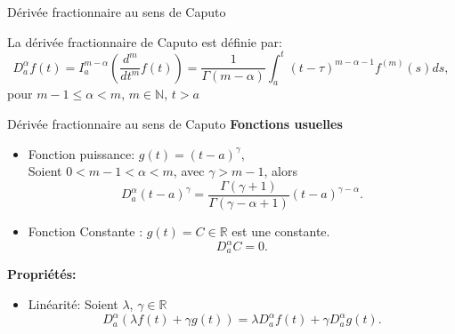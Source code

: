 \documentclass{sintefbeamer}
\begin{document}
\begin{frame}{Dérivée fractionnaire au sens de Caputo}
    \begin{definition}
    La dérivée fractionnaire de Caputo est définie par:
    \begin{equation}\label{eq:der_frac_caputo}
        D_a^{\alpha} f(t) = I_a^{m-\alpha}\left(\frac{d^m}{dt^m} f(t) \right) = \frac{1}{\Gamma(m-\alpha)}\int_a^t (t-\tau)^{m-\alpha -1} f^{(m)} (s)ds,
    \end{equation}
    pour $m-1\leq\alpha<m$, $m\in \mathbb{N}$, $t>a$
\end{definition}
\end{frame}
\begin{frame}{Dérivée fractionnaire au sens de Caputo}
    \textbf{Fonctions usuelles}
    \begin{itemize}
        \item Fonction puissance: $g(t)=(t-a)^\gamma$,\\
Soient $ 0 < m-1 < \alpha < m$, avec $\gamma > m-1$, alors 
\begin{equation*}
    D_a^{\alpha}(t-a)^{\gamma} = \frac{\Gamma(\gamma+1)}{\Gamma(\gamma-\alpha+1)}(t-a)^{\gamma - \alpha}.
\end{equation*}
\item Fonction Constante : $g(t) =C \in \mathbb{R}$ est une constante. \begin{equation*}
    D_a^{\alpha} C = 0.
\end{equation*} 
    \end{itemize}
    \textbf{Propriétés:}
    \begin{itemize}
        \item Linéarité: Soient $\lambda$, $\gamma \in \mathbb{R}$
\begin{equation}
    D_a^{\alpha}(\lambda f(t)+\gamma g(t))=\lambda D_a^{\alpha}f(t) + \gamma D_a^{\alpha}g(t).
\end{equation}
\end{itemize}
\end{frame}
\end{document}
